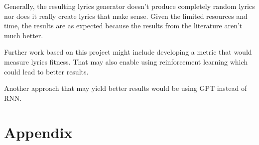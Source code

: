 \documentclass[conference]{IEEEtran}
\begin{document}
Generally,
the resulting lyrics generator doesn't produce completely random lyrics nor does
it really create lyrics that make sense. Given the limited resources and time,
the results are as expected because the results from the literature aren't much
better.

Further work based on this project might include developing a metric that would
measure lyrics fitness. That may also enable using reinforcement learning which
could lead to better results.

Another approach that may yield better results would be using GPT instead of RNN.




\section{Appendix}\label{APDX}
\end{document}
